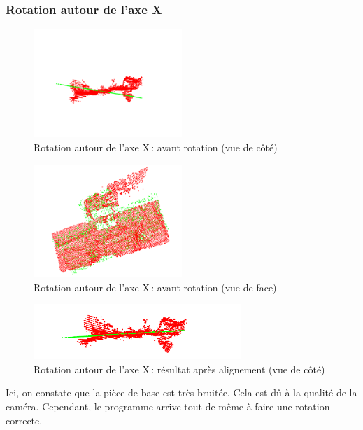 \clearpage

\subsubsection{Rotation autour de l'axe X}

\begin{figure}[H]
    \centering
    \includegraphics[width=0.50\textwidth]{assets/figures/rot_x_avt_cote.png}
    \caption{Rotation autour de l’axe X : avant rotation (vue de côté)}
    \label{fig:rot_x_avt_cote}
\end{figure}
\begin{figure}[H]
    \centering
    \includegraphics[width=0.50\textwidth]{assets/figures/rot_x_avt_face.png}
    \caption{Rotation autour de l’axe X : avant rotation (vue de face)}
    \label{fig:rot_x_avt_face}
\end{figure}
\begin{figure}[H]
    \centering
    \includegraphics[width=0.70\textwidth]{assets/figures/rot_x_aprs_cote.png}
    \caption{Rotation autour de l’axe X : résultat après alignement (vue de côté)}
    \label{fig:rot_x_aprs_cote}
\end{figure}
Ici, on constate que la pièce de base est très bruitée. Cela est dû à la qualité de la caméra. Cependant, le programme arrive tout de même à faire une rotation correcte.

